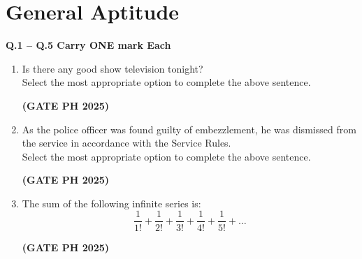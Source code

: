 \documentclass[14pt, a4paper]{extarticle}
\begin{document}
\section*{General Aptitude}
\textbf{Q.1 – Q.5 Carry ONE mark Each}

\begin{enumerate}[label=\textbf{Q.\arabic*}]

\item Is there any good show \underline{\hspace{3cm}} television tonight? \\
Select the most appropriate option to complete the above sentence.
\begin{enumerate}
\end{enumerate}
\hfill \textbf{(GATE PH 2025)}

\item As the police officer was found guilty of embezzlement, he was \underline{\hspace{3cm}} dismissed from the service in accordance with the Service Rules. \\
Select the most appropriate option to complete the above sentence.
\begin{enumerate}
\end{enumerate}
\hfill \textbf{(GATE PH 2025)}

\item The sum of the following infinite series is:
$$ \frac{1}{1!} + \frac{1}{2!} + \frac{1}{3!} + \frac{1}{4!} + \frac{1}{5!} + \dots $$
\begin{enumerate}
\end{enumerate}
\hfill \textbf{(GATE PH 2025)}


\end{enumerate}
\end{document}
